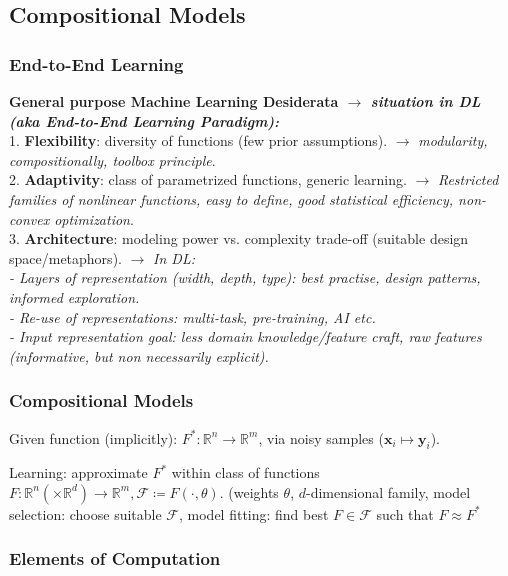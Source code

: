 \subsection{Compositional Models}
\label{sub:compositionalmodels}
    \subsubsection{End-to-End Learning}
    \label{ssub:endtoend}
    
    \textbf{General purpose Machine Learning Desiderata $\rightarrow$ \textit{situation in DL (aka End-to-End Learning Paradigm):}}\\
    1. \textbf{Flexibility}: diversity of functions (few prior assumptions). $\rightarrow$ \textit{modularity, compositionally, toolbox principle}.\\
    2. \textbf{Adaptivity}: class of parametrized functions, generic learning. $\rightarrow$ \textit{Restricted families of nonlinear functions, easy to define, good statistical efficiency, non-convex optimization}.\\
    3. \textbf{Architecture}: modeling power vs. complexity trade-off (suitable design space/metaphors). $\rightarrow$ \textit{In DL:\\
        - Layers of representation (width, depth, type): best practise, design patterns, informed exploration.\\
        - Re-use of representations: multi-task, pre-training, AI etc.\\
        - Input representation goal: less domain knowledge/feature craft, raw features (informative, but non necessarily explicit).}
    
    \subsubsection{Compositional Models}
    \label{ssub:compositionalmodels}
        Given function (implicitly):
        $F^*: \mathbb{R}^n\xrightarrow{}\mathbb{R}^m$,
        via noisy samples ($\mathbf{x}_i\mapsto\mathbf{y}_i$).
        
        Learning: approximate $F^*$ within class of functions
        $F:\mathbb{R}^n(\times\mathbb{R}^d)\xrightarrow{}\mathbb{R}^m, \mathcal{F}\coloneqq{F(\cdot{},\theta)}$. (weights $\theta$, $d$-dimensional family, model selection: choose suitable $\mathcal{F}$, model fitting: find best $F\in\mathcal{F}$ such that $F\approx F^*$
    
    
    \subsubsection{Elements of Computation}
    \label{ssub:elementscomputation}
    

